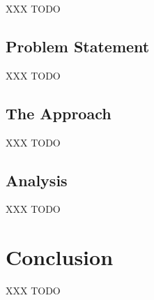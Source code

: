 XXX TODO

\subsection{Problem Statement}
\label{:rectangles:ao:ps}

XXX TODO

\subsection{The Approach}
\label{:rectangles:ao:approach}

XXX TODO

\subsection{Analysis}
\label{:rectangles:ao:analysis}

XXX TODO

\section{Conclusion}
\label{:rectangles:concl}

XXX TODO
